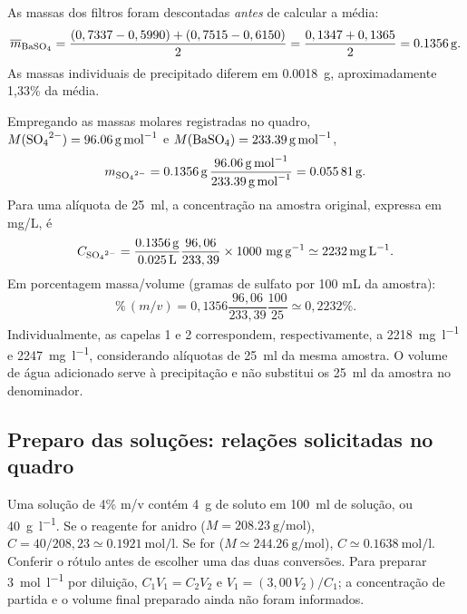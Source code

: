 \documentclass[a4paper,12pt]{article}
\begin{document}
As massas dos filtros foram descontadas \emph{antes} de calcular a média:
\begin{equation}
  \overline m_{\ce{BaSO4}} =
  \frac{(0,7337-0,5990)+(0,7515-0,6150)}{2}
  =\frac{0,1347+0,1365}{2}=\SI{0.1356}{\gram}.
\end{equation}
As massas individuais de precipitado diferem em \SI{0.0018}{\gram},
aproximadamente 1,33\% da média.

Empregando as massas molares registradas no quadro,
$M(\ce{SO4^{2-}})=\SI{96.06}{\gram\per\mole}$ e
$M(\ce{BaSO4})=\SI{233.39}{\gram\per\mole}$,
\begin{equation}
 m_{\ce{SO4^{2-}}}
 =\SI{0.1356}{\gram}\,
 \frac{\SI{96.06}{\gram\per\mole}}{\SI{233.39}{\gram\per\mole}}
 =\SI{0.05581}{\gram}.
\end{equation}
Para uma alíquota de \SI{25}{\milli\litre}, a concentração na amostra
original, expressa em mg/L, é
\begin{equation}
 C_{\ce{SO4^{2-}}}=\frac{\SI{0.1356}{\gram}}{\SI{0.025}{\litre}}
 \frac{96,06}{233,39}\times 1000\ \mathrm{mg\,g^{-1}}
 \simeq\SI{2232}{\milli\gram\per\litre}.
 \label{eq:conc}
\end{equation}
Em porcentagem massa/volume (gramas de sulfato por 100 mL da amostra):
\begin{equation}
 \%\,(m/v)=0,1356\frac{96,06}{233,39}\frac{100}{25}
 \simeq 0,2232\%.
\end{equation}
Individualmente, as capelas 1 e 2 correspondem, respectivamente, a
\SI{2218}{\milli\gram\per\litre} e
\SI{2247}{\milli\gram\per\litre}, considerando alíquotas de
\SI{25}{\milli\litre} da mesma amostra.
O volume de água adicionado serve à precipitação e não substitui os
\SI{25}{\milli\litre} da amostra no denominador.

\subsection*{Preparo das soluções: relações solicitadas no quadro}
Uma solução de  4\% m/v contém \SI{4}{\gram} de soluto em
\SI{100}{\milli\litre} de solução, ou \SI{40}{\gram\per\litre}.
Se o reagente for  anidro ($M=\SI{208.23}{\gram\per\mole}$),
$C=40/208,23\simeq\SI{0.1921}{\mole\per\litre}$.
Se for  ($M\simeq\SI{244.26}{\gram\per\mole}$),
$C\simeq\SI{0.1638}{\mole\per\litre}$. Conferir o rótulo antes de
escolher uma das duas conversões.
Para preparar  \SI{3}{\mole\per\litre} por diluição,
$C_1V_1=C_2V_2$ e $V_1=(3,00\,V_2)/C_1$; a concentração de partida e o
volume final preparado ainda não foram informados.
\end{document}
